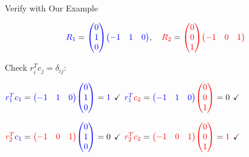 \documentclass[10pt]{beamer}
\theoremstyle{definition}
\newcommand{\rd}[1]{{\color{red}#1}}                  %
\newcommand{\bl}[1]{{\color{blue}#1}}                 %
\begin{document}
\begin{frame}{Verify with Our Example}

$$\bl{R_1} = \bl{\begin{pmatrix} 0 \\ 1 \\ 0 \end{pmatrix}}\bl{\begin{pmatrix} -1 & 1 & 0 \end{pmatrix}}, \quad \rd{R_2} = \rd{\begin{pmatrix} 0 \\ 0 \\ 1 \end{pmatrix}}\rd{\begin{pmatrix} -1 & 0 & 1 \end{pmatrix}}$$

\vspace{0.3em}

Check $r_i^T c_j = \delta_{ij}$:

\vspace{0.3em}

$\bl{r_1^T} \bl{c_1} = \bl{\begin{pmatrix} -1 & 1 & 0 \end{pmatrix}}\bl{\begin{pmatrix} 0 \\ 1 \\ 0 \end{pmatrix}} = \bl{1}$ $\checkmark$ \qquad
$\bl{r_1^T} \rd{c_2} = \bl{\begin{pmatrix} -1 & 1 & 0 \end{pmatrix}}\rd{\begin{pmatrix} 0 \\ 0 \\ 1 \end{pmatrix}} = 0$ $\checkmark$

\vspace{0.3em}

$\rd{r_2^T} \bl{c_1} = \rd{\begin{pmatrix} -1 & 0 & 1 \end{pmatrix}}\bl{\begin{pmatrix} 0 \\ 1 \\ 0 \end{pmatrix}} = 0$ $\checkmark$ \qquad
$\rd{r_2^T} \rd{c_2} = \rd{\begin{pmatrix} -1 & 0 & 1 \end{pmatrix}}\rd{\begin{pmatrix} 0 \\ 0 \\ 1 \end{pmatrix}} = \rd{1}$ $\checkmark$

\end{frame}
\end{document}
